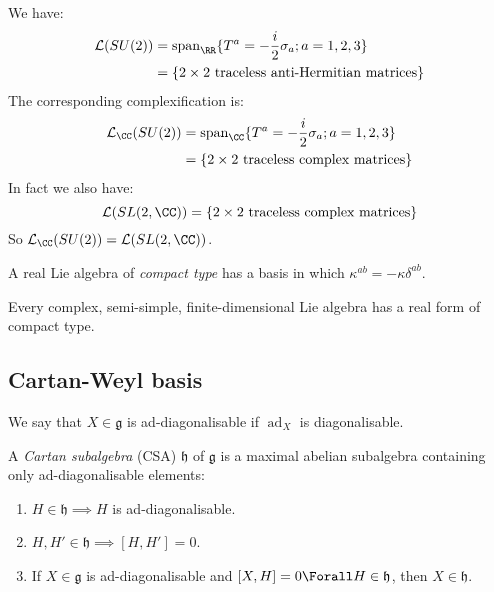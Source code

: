 \documentclass{jknotes}
\begin{document}
\begin{eg}
    We have:
    \begin{align}
        \mathcal{L}(SU(2)) &= \operatorname{span}_\RR\{T^a=-\frac{i}{2}\sigma_a; a=1,2,3\} \\
        &= \{2\times2 \text{ traceless anti-Hermitian matrices}\}
    \end{align}
    The corresponding complexification is:
    \begin{align}
        \mathcal{L}_\CC(SU(2)) &= \operatorname{span}_\CC\{T^a=-\frac{i}{2}\sigma_a; a=1,2,3\} \\
        &= \{2\times2 \text{ traceless complex matrices}\}
    \end{align}
     In fact we also have:
     \begin{equation}
         \mathcal{L}(SL(2,\CC)) = \{2\times2 \text{ traceless complex matrices}\}
     \end{equation}
     So \(\mathcal{L}_\CC(SU(2)) = \mathcal{L}(SL(2,\CC))\).
\end{eg}

\begin{defn}
    A real Lie algebra of \emph{compact type} has a basis in which \(\kappa^{ab} = -\kappa\delta^{ab}\).
\end{defn}

\begin{theorem}
    Every complex, semi-simple, finite-dimensional Lie algebra has a real form of compact type.
\end{theorem}

\subsection{Cartan-Weyl basis}

\begin{defn}
    We say that \(X \in \mathfrak{g}\) is ad-diagonalisable if \(\operatorname{ad}_X\) is diagonalisable.
\end{defn}

\begin{defn}
    A \emph{Cartan subalgebra} (CSA) \(\mathfrak{h}\) of \(\mathfrak{g}\) is a maximal abelian subalgebra containing only ad-diagonalisable elements:
    \begin{enumerate}[label=(\roman*)]
        \item \(H \in \mathfrak{h} \implies H\) is ad-diagonalisable.
        \item \(H,H' \in \mathfrak{h} \implies [H,H'] = 0\).
        \item If \(X \in \mathfrak{g}\) is ad-diagonalisable and \([X,H] = 0 \Forall H \in \mathfrak{h}\), then \(X\in\mathfrak{h}\).
    \end{enumerate}
\end{defn}
\end{document}
